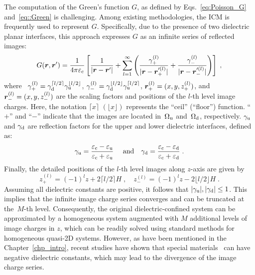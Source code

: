 The computation of the Green's function $G$, 
as defined by Eqs.~\eqref{eq:Poisson_G} and~\eqref{eq::Green} is challenging. 
Among existing methodologies, the ICM is frequently used to represent $G$. Specifically, due to the presence of two dielectric planar interfaces, this approach expresses $G$ as an infinite series of reflected images:
\begin{equation}\label{eq:ICM}
    G(\boldsymbol{r},\boldsymbol{r}')=\frac{1}{4 \pi \varepsilon_{\mathrm{c}}} \left[ \frac{1}{\lvert\boldsymbol{r} - \boldsymbol{r}^\prime\rvert} + \sum_{l = 1}^\infty \left( \frac{\gamma_{+}^{(l)}}{\lvert\boldsymbol{r} - \boldsymbol{r}_{+}^{\prime(l)}\rvert} + \frac{\gamma_{-}^{(l)}}{\lvert\boldsymbol{r} - \boldsymbol{r}_{-}^{\prime (l)}\rvert} \right) \right]\;,
\end{equation}
where~%
$\gamma_{+}^{(l)} = \gamma_{\text{d}}^{\lceil l/2 \rceil} \gamma_{\text{u}}^{\lfloor l/2 \rfloor}$, $\gamma_{-}^{(l)} = \gamma_{\text{d}}^{\lfloor l/2 \rfloor} \gamma_{\text{u}}^{\lceil l/2 \rceil}$, $\boldsymbol{r}_{+}^{(l)} = (x, y, z_{+}^{(l)})$, and $\boldsymbol{r}_{-}^{(l)} = (x, y, z_{-}^{(l)})$ are the scaling factors and positions of the $l$-th level image charges.
Here, the notation $\lceil x\rceil$ $(\lfloor x\rfloor)$ represents the ``ceil'' (``floor'') function. ``$+$'' and ``$-$'' indicate that the images are located in~$\Omega_{\mathrm{u}}$ and~$\Omega_{\mathrm{d}}$, respectively. $\gamma_{\text{u}}$ and $\gamma_{\text{d}}$ are reflection factors for the upper and lower dielectric interfaces, defined as:
\begin{equation}
    \gamma_{\mathrm{u}} = \frac{\varepsilon_{\mathrm{c}} - \varepsilon_{\mathrm{u}}}{\varepsilon_{\mathrm{c}} + \varepsilon_{\mathrm{u}}}~\quad\text{and}\quad
    \gamma_{\mathrm{d}} = \frac{\varepsilon_{\mathrm{c}} - \varepsilon_{\mathrm{d}}}{\varepsilon_{\mathrm{c}} + \varepsilon_{\mathrm{d}}}\;.
\end{equation}
Finally, the detailed positions of the $l$-th level images along $z$-axis are given by 
\begin{equation}\label{eq:z_l}
    z_{+}^{(l)} = (-1)^l z + 2\lceil l/2\rceil H \;,\quad z_{-}^{(l)} = (-1)^l z - 2\lfloor l/2\rfloor H \;.
\end{equation}
Assuming all dielectric constants are positive, it follows that $\lvert\gamma_{\mathrm{u}}\rvert,\lvert\gamma_{\text{d}}\rvert\leq 1$. 
This implies that the infinite image charge series converges and can be truncated at the~$M$-th level. 
Consequently, the original dielectric-confined system can be approximated by a homogeneous system augmented with $M$ additional levels of image charges in $z$, which can be readily solved using standard methods for homogeneous quasi-2D systems.
However, as have been mentioned in the Chapter~\ref{chp_intro}, recent studies have shown that special materials~\cite{Kornyshev1996Static, Schlaich2016Water, Kornyshev2021Nonlocal} can have negative dielectric constants, which may lead to the divergence of the image charge series.

